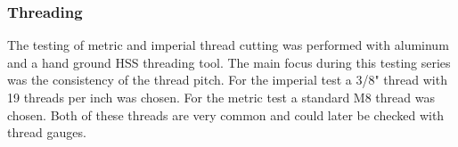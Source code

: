 \subsubsection{Threading}
The testing of metric and imperial thread cutting was performed with aluminum and a hand ground HSS threading tool. The main focus during this testing series was the consistency of the thread pitch. For the imperial test a 3/8" thread with 19 threads per inch was chosen. For the metric test a standard M8 thread was chosen. Both of these threads are very common and could later be checked with thread gauges.












